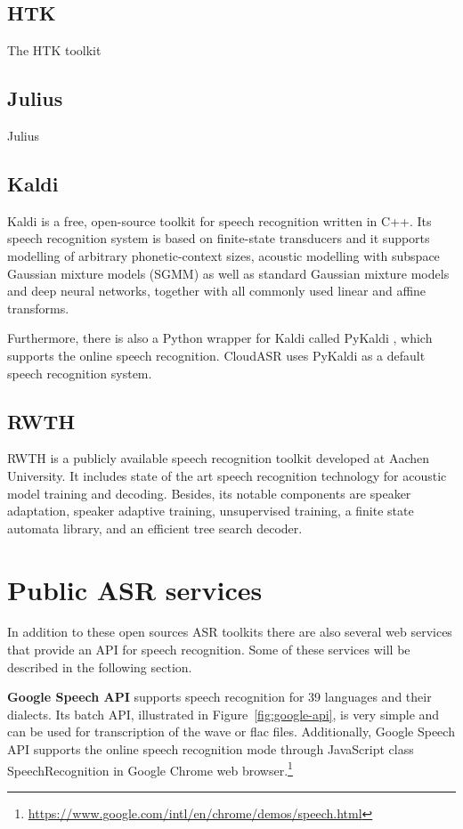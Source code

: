 \subsection{HTK}
The HTK \cite{young1997htk} toolkit

\subsection{Julius}
Julius \cite{lee2001julius}
\blindtext

\subsection{Kaldi}
Kaldi \cite{povey2011kaldi} is a free, open-source toolkit for speech recognition written in C++.
Its speech recognition system is based on finite-state transducers
  and it supports modelling of arbitrary phonetic-context sizes,
  acoustic modelling with subspace Gaussian mixture models (SGMM)
  as well as standard Gaussian mixture models and deep neural networks,
  together with all commonly used linear and affine transforms.

Furthermore, there is also a Python wrapper for Kaldi called PyKaldi \cite{platek2014free},
  which supports the online speech recognition.
CloudASR uses PyKaldi as a default speech recognition system.

\subsection{RWTH}
RWTH \cite{rybach2009rwth} is a publicly available speech recognition toolkit developed at Aachen University.
It includes state of the art speech recognition technology for acoustic model training and decoding.
Besides, its notable components are speaker adaptation,
  speaker adaptive training,
  unsupervised training,
  a finite state automata library,
  and an efficient tree search decoder.


\section{Public ASR services}
In addition to these open sources ASR toolkits
  there are also several web services that provide an API for speech recognition.
Some of these services will be described in the following section.

\textbf{Google Speech API} supports speech recognition for 39 languages and their dialects.
Its batch API, illustrated in Figure~\ref{fig:google-api}, is very simple and can be used for transcription of the wave or flac files.
Additionally,
  Google Speech API supports the online speech recognition mode through JavaScript class SpeechRecognition in Google Chrome web browser.\footnote{\url{https://www.google.com/intl/en/chrome/demos/speech.html}}

